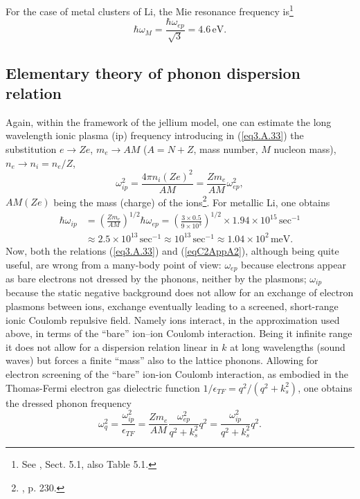For the case of metal clusters of Li, the Mie resonance frequency is\footnote{See \cite{Bertsch:05}, Sect. 5.1, also Table 5.1.}
\begin{equation}
\hbar\omega_M=\frac{\hbar\omega_{ep}}{\sqrt{3}}=4.6\,\text{eV}.
\end{equation}
\subsection{Elementary theory of phonon dispersion relation}\label{App3A3}
Again, within the framework of the jellium model, one can estimate the long wavelength ionic plasma (ip) frequency introducing in (\ref{eq3.A.33})  the substitution $e\rightarrow Ze$, $m_e\rightarrow AM$ ($A=N+Z$, mass number, $M$ nucleon mass), $n_e\rightarrow n_i=n_e/Z$,
\begin{equation}\label{eqC2AppA2}
\omega_{ip}^2=\frac{4\pi n_i(Ze)^2}{AM}=\frac{Zm_e}{AM}\omega_{ep}^2,
\end{equation}
$AM (Ze)$ being the mass (charge) of the ions\footnote{\cite{Ketterson:99}, p. 230.}.
For metallic Li, one obtains
\begin{align}
\nonumber\hbar\omega_{ip}&=\left(\frac{Zm_e}{AM}\right)^{1/2}\hbar\omega_{ep}=\left(\frac{3\times0.5}{9\times10^3}\right)^{1/2}\times1.94\times 10^{15}\,\text{sec}^{-1}\\
&\approx2.5\times10^{13}\,\text{sec}^{-1}\approx10^{13}\,\text{sec}^{-1}\approx1.04\times10^2\,\text{meV}.
\end{align}
Now, both  the  relations (\ref{eq3.A.33}) and (\ref{eqC2AppA2}), although being quite useful, are wrong from a many-body point of view: $\omega_{ep}$ because electrons appear as bare electrons not dressed by the phonons, neither by the plasmons; $\omega_{ip}$ because the  static negative background does not allow for an exchange of electron plasmons between ions, exchange eventually leading to a screened, short-range ionic Coulomb repulsive field. Namely ions interact, in the approximation used above, in terms of the ``bare'' ion--ion Coulomb interaction. Being it infinite range it does not allow for a dispersion relation linear in $k$ at long wavelengths (sound waves) but forces a finite ``mass'' also to the lattice phonons. Allowing for electron screening of the ``bare'' ion-ion Coulomb interaction, as embodied in the Thomas-Fermi electron gas dielectric function $1/\epsilon_{TF}=q^2/(q^2+k_s^2)$, one obtains the dressed phonon frequency
\begin{equation}\label{eqC2AppA3}
\omega_q^2=\frac{\omega_{ip}^2}{\epsilon_{TF}}=\frac{Zm_e}{AM}\frac{\omega_{ep}^2}{q^2+k_s^2}q^2=\frac{\omega_{ip}^2}{q^2+k_s^2}q^2.
\end{equation}
